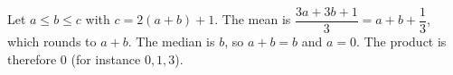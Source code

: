 Let $a\le b\le c$ with $c=2(a+b)+1$. The mean is $\dfrac{3a+3b+1}{3}=a+b+\dfrac13$, which rounds to $a+b$. The median is $b$, so $a+b=b$ and $a=0$. The product is therefore $\boxed{0}$ (for instance $0,1,3$).

